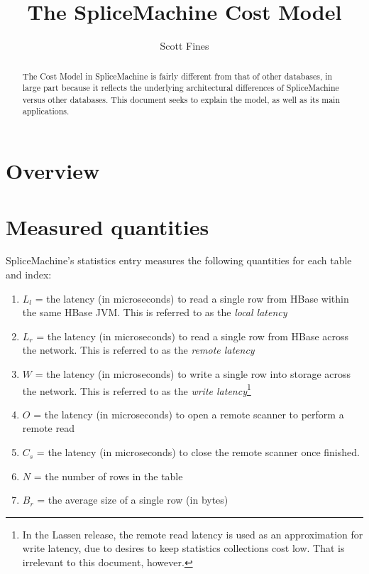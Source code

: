 \documentclass[10pt]{amsart}
\begin{document}
\title{The SpliceMachine Cost Model}
\author{Scott Fines}

\begin{abstract}
The Cost Model in SpliceMachine is fairly different from that of other databases, in large part because it reflects the underlying architectural differences of SpliceMachine versus other databases. This document seeks to explain the model, as well as its main applications.
\end{abstract}

\maketitle

\section{Overview}

\section{Measured quantities}
SpliceMachine's statistics entry measures the following quantities for each table and index:

\begin{enumerate}
				\item $L_l$ = the latency (in microseconds) to read a single row from HBase within the same HBase JVM. This is referred to as the \emph{local latency}
				\item $L_r$ = the latency (in microseconds) to read a single row from HBase across the network. This is referred to as the \emph{remote latency}
				\item $W$ = the latency (in microseconds) to write a single row into storage across the network. This is referred to as the \emph{write latency}\footnote{In the Lassen release, the remote read latency is used as an approximation for write latency, due to desires to keep statistics collections cost low. That is irrelevant to this document, however.}
				\item $O$ = the latency (in microseconds) to open a remote scanner to perform a remote read
				\item $C_s$ = the latency (in microseconds) to close the remote scanner once finished.
				\item $N$ = the number of rows in the table
				\item $B_r$ = the average size of a single row (in bytes)
\end{enumerate}
\end{document}
